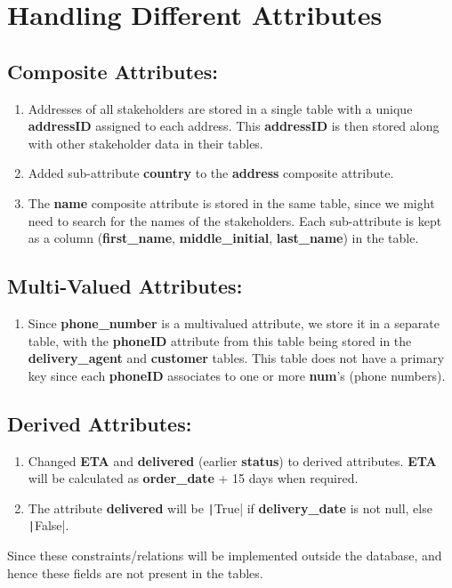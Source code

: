 \documentclass[12pt]{report}
\begin{document}
    \section*{\Huge Handling Different Attributes}
    \subsection*{Composite Attributes:}
    \begin{enumerate}
        \item
        Addresses of all stakeholders are stored in a single table with a unique \textbf{addressID} assigned to each address.
        This \textbf{addressID} is then stored along with other stakeholder data in their tables.
        \item
        Added sub-attribute \textbf{country} to the \textbf{address} composite attribute.
        \item
        The \textbf{name} composite attribute is stored in the same table, since we might need to search for the names of the stakeholders.
        Each sub-attribute is kept as a column (\textbf{first\_name}, \textbf{middle\_initial}, \textbf{last\_name}) in the table.
    \end{enumerate}

    \subsection*{Multi-Valued Attributes:}
    \begin{enumerate}
        \item
        Since \textbf{phone\_number} is a multivalued attribute, we store it in a separate table, with the \textbf{phoneID} attribute
        from this table being stored in the \textbf{delivery\_agent} and \textbf{customer} tables.
        This table does not have a primary key since each \textbf{phoneID} associates to one or more \textbf{num}'s (phone numbers).
    \end{enumerate}

    \subsection*{Derived Attributes:}
    \begin{enumerate}
        \item
        Changed \textbf{ETA} and \textbf{delivered} (earlier \textbf{status}) to derived attributes.
        \textbf{ETA} will be calculated as \textbf{order\_date} + 15 days when required.
        \item
        The attribute \textbf{delivered} will be \texttt|True| if \textbf{delivery\_date} is not null, else \texttt|False|.
    \end{enumerate}
    Since these constraints/relations will be implemented outside the database, and hence these fields are not present in the tables.
\end{document}
